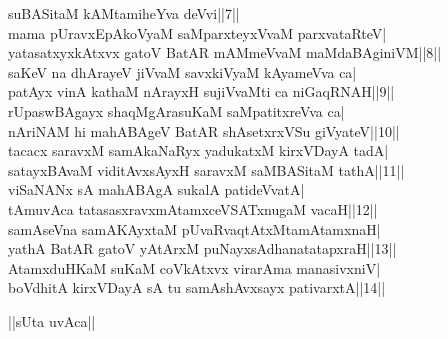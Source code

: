 \documentclass{article}
\begin{document}
suBASitaM kAMtamiheYva deVvi||7||\\
mama pUravxEpAkoVyaM saMparxteyxVvaM parxvataRteV|\\
yatasatxyxkAtxvx gatoV BatAR mAMmeVvaM maMdaBAginiVM||8||\\
saKeV na dhArayeV jiVvaM savxkiVyaM kAyameVva ca|\\
patAyx vinA kathaM nArayxH sujiVvaMti ca niGaqRNAH||9||\\
rUpaswBAgayx shaqMgArasuKaM saMpatitxreVva ca|\\
nAriNAM hi mahABAgeV BatAR shAsetxrxVSu giVyateV||10||\\
tacacx saravxM samAkaNaRyx yadukatxM kirxVDayA tadA|\\
satayxBAvaM viditAvxsAyxH saravxM saMBASitaM tathA||11||\\
viSaNANx sA mahABAgA sukalA patideVvatA|\\
tAmuvAca tatasasxravxmAtamxceVSATxnugaM vacaH||12||\\
samAseVna samAKAyxtaM pUvaRvaqtAtxMtamAtamxnaH|\\
yathA BatAR gatoV yAtArxM puNayxsAdhanatatapxraH||13||\\
AtamxduHKaM suKaM coVkAtxvx virarAma manasivxniV|\\
boVdhitA kirxVDayA sA tu samAshAvxsayx pativarxtA||14||\\

\begin{center}
||sUta uvAca||
\end{center}
\end{document}
